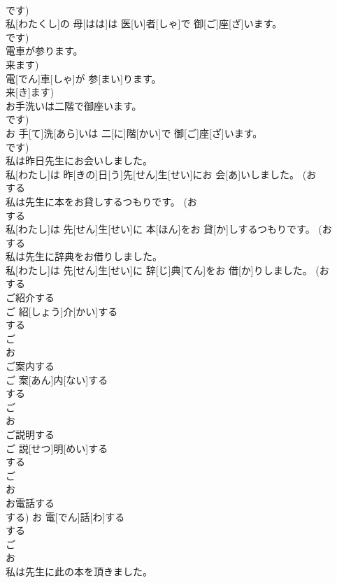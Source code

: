 \documentclass[8pt]{extreport}
\begin{document}
\begin{CJK}{UTF8}{min}
\\	です)	
\\	私[わたくし]の 母[はは]は 医[い]者[しゃ]で 御[ご]座[ざ]います。 
\\	です)
\\	電車が参ります。 
\\	来ます)	
\\	電[でん]車[しゃ]が 参[まい]ります。 
\\	来[き]ます)
\\	お手洗いは二階で御座います。 
\\	です)	
\\	お 手[て]洗[あら]いは 二[に]階[かい]で 御[ご]座[ざ]います。 
\\	です)
\\	私は昨日先生にお会いしました。	
\\	私[わたし]は 昨[きの]日[う]先[せん]生[せい]にお 会[あ]いしました。 (お 
\\	する 
\\	私は先生に本をお貸しするつもりです。 (お 
\\	する 
\\	私[わたし]は 先[せん]生[せい]に 本[ほん]をお 貸[か]しするつもりです。 (お 
\\	する 
\\	私は先生に辞典をお借りしました。	
\\	私[わたし]は 先[せん]生[せい]に 辞[じ]典[てん]をお 借[か]りしました。 (お 
\\	する 
\\	ご紹介する	
\\	ご 紹[しょう]介[かい]する 
\\	する 
\\	ご 
\\	お 
\\	ご案内する	
\\	ご 案[あん]内[ない]する 
\\	する 
\\	ご 
\\	お 
\\	ご説明する	
\\	ご 説[せつ]明[めい]する 
\\	する 
\\	ご 
\\	お 
\\	お電話する	
\\	する)	お 電[でん]話[わ]する 
\\	する 
\\	ご 
\\	お 
\\	私は先生に此の本を頂きました。	

\end{CJK}
\end{document}
